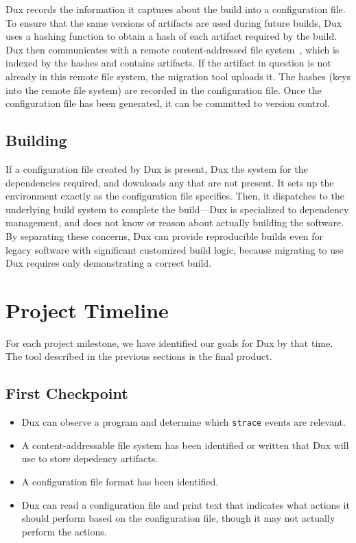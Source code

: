 \documentclass[10pt,conference]{IEEEtran}
\begin{document}
Dux records the information it captures about the build into a configuration file.
To ensure that the same versions of artifacts are used during future builds,
Dux uses a hashing function to obtain a hash of each artifact required by the build.
Dux then communicates with a remote content-addressed file system~\cite{venti},
which is indexed by the hashes and contains artifacts.
If the artifact in question is not already in this remote file system, the migration tool uploads it.
The hashes (keys into the remote file system) are recorded in the configuration file.
Once the configuration file has been generated, it can be committed to version control.

\subsection{Building}

If a configuration file created by Dux is present, Dux the system for the dependencies required,
and downloads any that are not present.
It sets up the environment exactly as the configuration file specifies.
Then, it dispatches to the underlying build system to complete the build---Dux is specialized
to dependency management, and does not know or reason about actually building the software.
By separating these concerns, Dux can provide reproducible builds even for legacy software
with significant customized build logic, because migrating to use Dux requires only
demonstrating a correct build.

\section{Project Timeline}

For each project milestone, we have identified our goals for Dux by that time. The tool described
in the previous sections is the final product.

\subsection{First Checkpoint}

\begin{itemize}
\item{Dux can observe a program and determine which \texttt{strace} events are relevant.}
\item{A content-addressable file system has been identified or written
that Dux will use to store depedency artifacts.}
\item{A configuration file format has been identified.}
\item{Dux can read a configuration file and print text that indicates what actions it
should perform based on the configuration file, though it may not actually perform the actions.}
\end{itemize}
\end{document}
